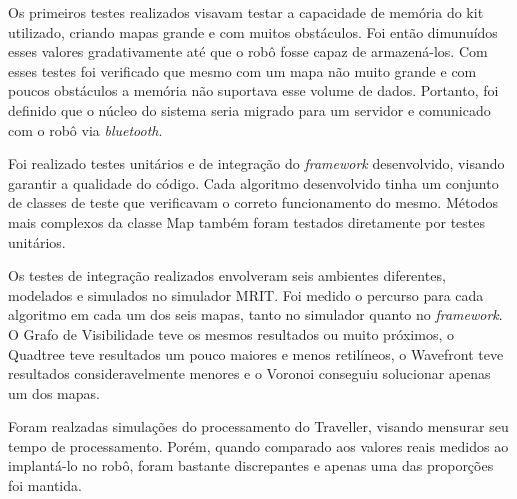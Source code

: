 Os primeiros testes realizados visavam testar a capacidade  de memória do kit utilizado, criando mapas grande e com muitos obstáculos. Foi então dimunuídos esses valores gradativamente até que o robô fosse capaz de armazená-los. Com esses testes foi verificado que mesmo com um mapa não muito grande e com poucos obstáculos a memória não suportava esse volume de dados. Portanto, foi definido que o núcleo do sistema seria migrado para um servidor e comunicado com o robô via \textit{bluetooth}.

Foi realizado testes unitários e de integração do \textit{framework} desenvolvido, visando garantir a qualidade do código. Cada algoritmo desenvolvido tinha um conjunto de classes de teste que verificavam o correto funcionamento do mesmo. Métodos mais complexos da classe Map também foram testados diretamente por testes unitários.

Os testes de integração realizados envolveram seis ambientes diferentes, modelados e simulados no simulador MRIT. Foi medido o percurso para cada algoritmo em cada um dos seis mapas, tanto no simulador quanto no \textit{framework}. O Grafo de Visibilidade teve os mesmos resultados ou muito próximos, o Quadtree teve resultados um pouco maiores e menos retilíneos, o Wavefront teve resultados consideravelmente menores e o Voronoi conseguiu solucionar apenas um dos mapas.

Foram realzadas simulações do processamento do Traveller, visando mensurar seu tempo de processamento. Porém, quando comparado aos valores reais medidos ao implantá-lo no robô, foram bastante discrepantes e apenas uma das proporções foi mantida.